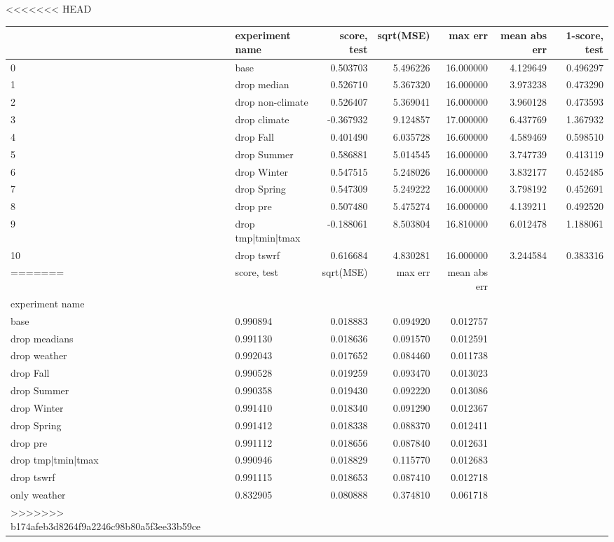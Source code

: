 <<<<<<< HEAD
\begin{tabular}{llrrrrr}
\toprule
 & experiment name & score, test & sqrt(MSE) & max err & mean abs err & 1-score, test \\
\midrule
0 & base & 0.503703 & 5.496226 & 16.000000 & 4.129649 & 0.496297 \\
1 & drop median & 0.526710 & 5.367320 & 16.000000 & 3.973238 & 0.473290 \\
2 & drop non-climate & 0.526407 & 5.369041 & 16.000000 & 3.960128 & 0.473593 \\
3 & drop climate & -0.367932 & 9.124857 & 17.000000 & 6.437769 & 1.367932 \\
4 & drop Fall & 0.401490 & 6.035728 & 16.600000 & 4.589469 & 0.598510 \\
5 & drop Summer & 0.586881 & 5.014545 & 16.000000 & 3.747739 & 0.413119 \\
6 & drop Winter & 0.547515 & 5.248026 & 16.000000 & 3.832177 & 0.452485 \\
7 & drop Spring & 0.547309 & 5.249222 & 16.000000 & 3.798192 & 0.452691 \\
8 & drop pre & 0.507480 & 5.475274 & 16.000000 & 4.139211 & 0.492520 \\
9 & drop tmp|tmin|tmax & -0.188061 & 8.503804 & 16.810000 & 6.012478 & 1.188061 \\
10 & drop tswrf & 0.616684 & 4.830281 & 16.000000 & 3.244584 & 0.383316 \\
=======
\begin{tabular}{rrrrr}
\toprule
 & score, test & sqrt(MSE) & max err & mean abs err \\
experiment name &  &  &  &  \\
\midrule
base & 0.990894 & 0.018883 & 0.094920 & 0.012757 \\
drop meadians & 0.991130 & 0.018636 & 0.091570 & 0.012591 \\
drop weather & 0.992043 & 0.017652 & 0.084460 & 0.011738 \\
drop Fall & 0.990528 & 0.019259 & 0.093470 & 0.013023 \\
drop Summer & 0.990358 & 0.019430 & 0.092220 & 0.013086 \\
drop Winter & 0.991410 & 0.018340 & 0.091290 & 0.012367 \\
drop Spring & 0.991412 & 0.018338 & 0.088370 & 0.012411 \\
drop pre & 0.991112 & 0.018656 & 0.087840 & 0.012631 \\
drop tmp|tmin|tmax & 0.990946 & 0.018829 & 0.115770 & 0.012683 \\
drop tswrf & 0.991115 & 0.018653 & 0.087410 & 0.012718 \\
only weather & 0.832905 & 0.080888 & 0.374810 & 0.061718 \\
>>>>>>> b174afeb3d8264f9a2246c98b80a5f3ee33b59ce
\bottomrule
\end{tabular}
